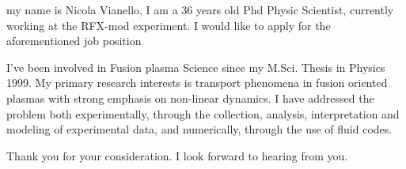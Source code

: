 \documentclass[11pt,stdletter,dateno,sigleft]{newlfm}
\begin{document}
\begin{newlfm}
my name is Nicola Vianello, I am a 36 years old Phd Physic Scientist,
currently working at the RFX-mod experiment. I would like to apply for
the aforementioned job position

I've been involved in Fusion plasma Science since my M.Sci. Thesis in
Physics 1999. My primary research interests is transport phenomena in fusion
oriented plasmas with strong emphasis on non-linear dynamics. I have
addressed the problem both experimentally, through the collection, 
analysis, interpretation and modeling of experimental data, and
numerically, through the use of fluid codes.  


Thank you for your consideration.  I look forward to
hearing from you.

\end{newlfm}
\end{document}
